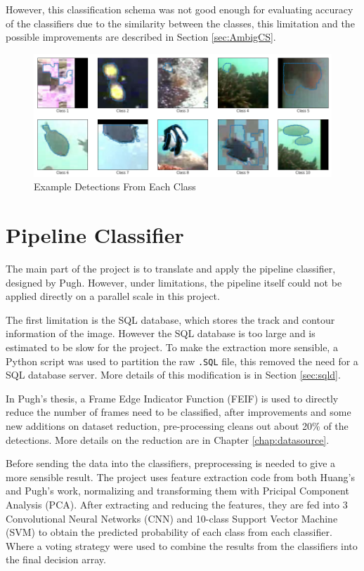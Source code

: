 \documentclass[bsc,logo,twoside,fullspacing,parskip]{infthesis}
\begin{document}
However, this classification schema was not good enough for evaluating accuracy of the classifiers due to the similarity between the classes, this limitation and the possible improvements are described in Section \ref{sec:AmbigCS}.

\begin{figure}
    \centering
    \includegraphics[scale=0.4]{graph/class_sample.png}
    \caption{Example Detections From Each Class}
    \label{fig:classes}
\end{figure}

\section{Pipeline Classifier}

The main part of the project is to translate and apply the pipeline classifier, designed by Pugh\cite{Pugh}. 
However, under limitations, the pipeline itself could not be applied directly on a parallel scale in this project.

The first limitation is the SQL database, which stores the track and contour information of the image. 
However the SQL database is too large and is estimated to be slow for the project.
To make the extraction more sensible, a Python script was used to partition the raw {\tt .SQL} file, this removed the need for a SQL database server. 
More details of this modification is in Section \ref{sec:sqld}.

In Pugh's thesis\cite{Pugh}, a Frame Edge Indicator Function (FEIF) is used to directly reduce the number of frames need to be classified, after improvements and some new additions on dataset reduction, pre-processing cleans out about 20\% of the detections. More details on the reduction are in Chapter \ref{chap:datasource}.

Before sending the data into the classifiers, preprocessing is needed to give a more sensible result.
The project uses feature extraction code from both Huang's\cite{Huang} and Pugh's\cite{Pugh} work, normalizing and transforming them with Pricipal Component Analysis (PCA).
After extracting and reducing the features, they are fed into 3 Convolutional Neural Networks (CNN) and 10-class Support Vector Machine (SVM) to obtain the predicted probability of each class from each classifier.
Where a voting strategy were used to combine the results from the classifiers into the final decision array.
\end{document}
